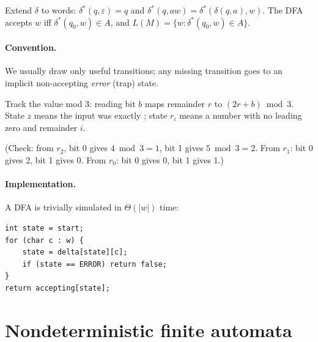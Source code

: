 Extend $\delta$ to words: $\delta^*(q,\varepsilon) = q$ and $\delta^*(q, aw) =
\delta^*(\delta(q,a), w)$. The DFA accepts $w$ iff $\delta^*(q_0, w) \in A$, and
$L(M) = \{w : \delta^*(q_0,w)\in A\}$.

\paragraph{Convention.} We usually draw only useful transitions; any missing transition
goes to an implicit non-accepting \emph{error} (trap) state.

\begin{example}
Track the value mod 3: reading bit $b$ maps remainder $r$ to $(2r+b) \bmod 3$. State $z$
means the input was exactly ; state $r_i$ means a number with no leading zero and
remainder $i$.
\begin{center}
\end{center}
(Check: from $r_2$, bit 0 gives $4\bmod 3 = 1$, bit 1 gives $5 \bmod 3 = 2$. From $r_1$:
bit 0 gives 2, bit 1 gives 0. From $r_0$: bit 0 gives 0, bit 1 gives 1.)
\end{example}

\paragraph{Implementation.} A DFA is trivially simulated in $\Theta(|w|)$ time:
\begin{lstlisting}[style=cpp]
int state = start;
for (char c : w) {
    state = delta[state][c];
    if (state == ERROR) return false;
}
return accepting[state];
\end{lstlisting}

\section{Nondeterministic finite automata}


